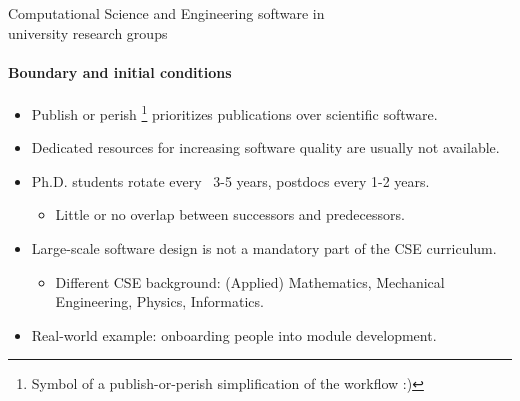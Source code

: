 



\begin{frame}{Computational Science and Engineering software in\\university research groups}
	\framesubtitle{Boundary and initial conditions}
	
	\vfill
	\begin{itemize}
            \item Publish or perish \faGraduationCap\footnote{Symbol of a publish-or-perish simplification of the workflow :)} prioritizes publications over scientific software.
		\item Dedicated resources for increasing software quality are usually not available.
		\item Ph.D. students rotate every ~3-5 years, postdocs every 1-2 years. 
			\begin{itemize}
				\item Little or no overlap between successors and predecessors. 
			\end{itemize}
		\item Large-scale software design is not a mandatory part of the CSE curriculum. 
			\begin{itemize}
				\item Different CSE background: (Applied) Mathematics, Mechanical Engineering, Physics, Informatics.
			\end{itemize}
		\item Real-world example: onboarding people into \href{https://www.openfoam.com/documentation/guides/latest/api/classes.html}{} module development.
	\end{itemize}
\end{frame}

